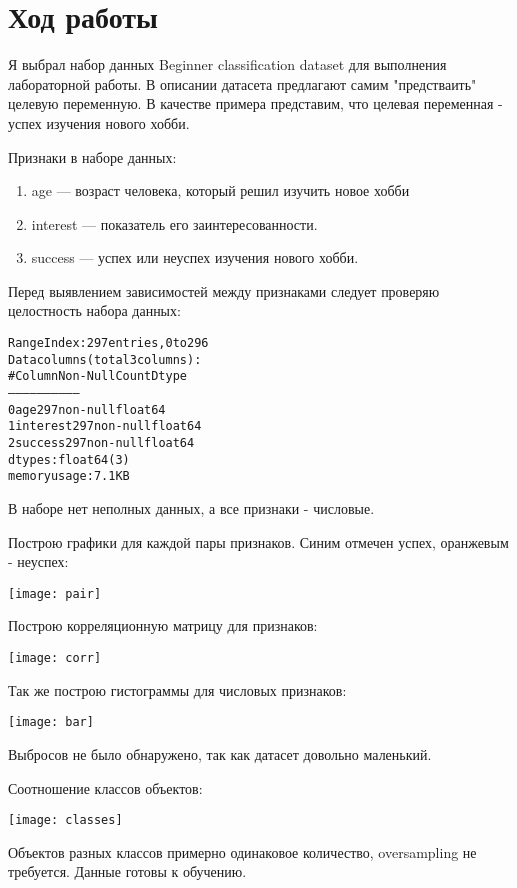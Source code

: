 \graphicspath{{images/}}

\section{Ход работы}

Я выбрал набор данных Beginner classification dataset \cite{kaggle} для выполнения лабораторной работы. В описании датасета предлагают самим 
"предстваить" целевую переменную. В качестве примера представим, что целевая переменная - успех изучения нового хобби.

Признаки в наборе данных:

\begin{enumerate}
    \item
    age --- возраст человека, который решил изучить новое хобби
    \item
    interest --- показатель его заинтересованности.
    \item
    success --- успех или неуспех изучения нового хобби.
\end{enumerate}

Перед выявлением зависимостей между признаками следует проверяю целостность набора данных:
\begin{alltt}
RangeIndex: 297 entries, 0 to 296
Data columns (total 3 columns):
 #   Column    Non-Null Count  Dtype  
---  ------    --------------  -----  
 0   age       297 non-null    float64
 1   interest  297 non-null    float64
 2   success   297 non-null    float64
dtypes: float64(3)
memory usage: 7.1 KB
\end{alltt}

В наборе нет неполных данных, а все признаки - числовые.
\pagebreak

Построю графики для каждой пары признаков. Синим отмечен успех, оранжевым - неуспех:
\begin{center}
\texttt{[image: pair]}
\end{center}\pagebreak

Построю корреляционную матрицу для признаков:
\begin{center}
\texttt{[image: corr]}
\end{center}
Так же построю гистограммы для числовых признаков:
\begin{center}
\texttt{[image: bar]}
\end{center}
Выбросов не было обнаружено, так как датасет довольно маленький.
\pagebreak

Соотношение классов объектов:
\begin{center}
\texttt{[image: classes]}
\end{center}
Объектов разных классов примерно одинаковое количество, oversampling не требуется. Данные готовы к обучению.

\pagebreak
